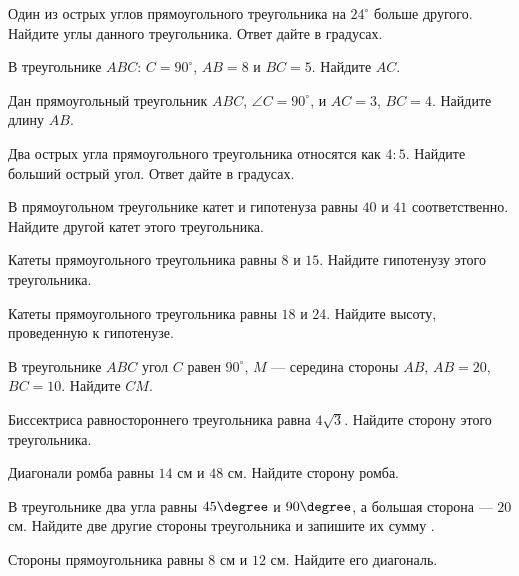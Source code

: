 \begin{class}[number=4]
	\begin{listofex}
		\item Один из острых углов прямоугольного треугольника на \( 24^{\circ} \) больше другого. Найдите углы данного треугольника. Ответ дайте в градусах.
		\item В треугольнике \( ABC \): \( C=90^{\circ} \), \( AB=8 \) и \( BC=5 \). Найдите \( AC \).
		\item Дан прямоугольный треугольник \( ABC \), \( \angle C=90^{\circ} \), и \( AC=3 \), \( BC=4 \). Найдите длину \( AB \).
		\item Два острых угла прямоугольного треугольника относятся как \( 4:5 \). Найдите больший острый угол. Ответ дайте в градусах.
		\item В прямоугольном треугольнике катет и гипотенуза равны \( 40 \) и \( 41 \) соответственно. Найдите другой катет этого треугольника.
		\item Катеты прямоугольного треугольника равны \( 8 \) и \( 15 \). Найдите гипотенузу этого треугольника.
		\item Катеты прямоугольного треугольника равны \( 18 \) и \( 24 \). Найдите высоту, проведенную к гипотенузе.
		\item В треугольнике \( ABC \) угол \( C \) равен \( 90^{\circ} \), \( M \)  — середина стороны \( AB \), \( AB  =  20 \), \( BC = 10 \). Найдите \( CM \).
		\item Биссектриса равностороннего треугольника равна  \( 4\sqrt{3} \). Найдите сторону этого треугольника.
		\item Диагонали ромба равны \( 14 \) см и \( 48 \) см. Найдите сторону ромба.
		\item В треугольнике два угла равны \( 45\degree \) и \( 90\degree \), а большая сторона — \( 20 \) см. Найдите две другие стороны треугольника и запишите их сумму .
		\item Стороны прямоугольника равны \( 8 \) см и \( 12 \) см. Найдите его диагональ.
	\end{listofex}
\end{class}

